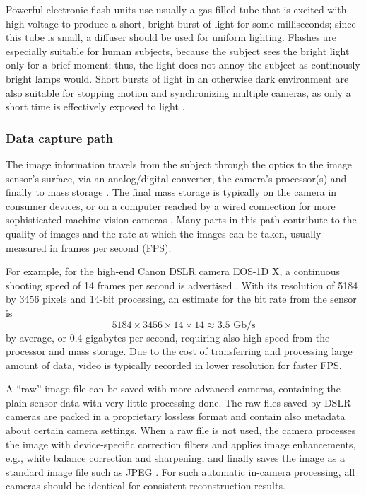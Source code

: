 Powerful electronic flash units use usually a gas-filled tube that is excited with high voltage to produce a short, bright burst of light for some milliseconds;
since this tube is small, a diffuser should be used for uniform lighting.
Flashes are especially suitable for human subjects, because the subject sees the bright light only for a brief moment; thus, the light does not annoy the subject as continously bright lamps would.
Short bursts of light in an otherwise dark environment are also suitable for stopping motion and synchronizing multiple cameras, as only a short time is effectively exposed to light \cite{langford2000basic}.


\subsubsection{Data capture path} %

The image information travels from the subject through the optics to the image sensor's surface, via an analog/digital converter, the camera's processor(s) and finally to mass storage \cite{szeliski10vision}.
The final mass storage is typically on the camera in consumer devices, or on a computer reached by a wired connection for more sophisticated machine vision cameras \cite{hornberg2007handbook,ni2013choosing}.
Many parts in this path contribute to the quality of images and the rate at which the images can be taken, usually measured in frames per second (FPS).


For example, for the high-end Canon DSLR camera EOS-1D X, a continuous shooting speed of 14 frames per second is advertised \cite{eos1dx}.
With its resolution of 5184 by 3456 pixels and 14-bit processing, an estimate for the bit rate from the sensor is
\begin{equation} \label{eq:eos1dspeed}
5184 \times 3456 \times 14 \times 14 \approx 3.5\text{ Gb/s}
\end{equation}
by average, or 0.4 gigabytes per second, requiring also high speed from the processor and mass storage.
Due to the cost of transferring and processing large amount of data, video is typically recorded in lower resolution for faster FPS.


A ``raw'' image file can be saved with more advanced cameras, containing the plain sensor data with very little processing done.
The raw files saved by DSLR cameras are packed in a proprietary lossless format and contain also metadata about certain camera settings.
When a raw file is not used, the camera processes the image with device-specific correction filters and applies image enhancements, e.g., white balance correction and sharpening, and finally saves the image as a standard image file such as JPEG \cite[p.~412]{szeliski10vision}.
For such automatic in-camera processing, all cameras should be identical for consistent reconstruction results.

